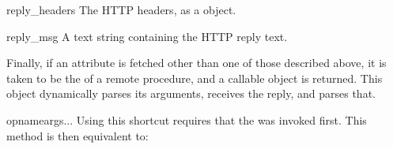\begin{memberdesc}{reply_headers}
The HTTP headers, as a  object.
\end{memberdesc}

\begin{memberdesc}{reply_msg}
A text string containing the HTTP reply text.
\end{memberdesc}

Finally, if an attribute is fetched other than one of those described
above, it is taken to be the  of a remote procedure,
and a callable object is returned.
This object dynamically parses its arguments, receives the reply, and
parses that.

\begin{methoddesc}{opname}{args...}
Using this shortcut requires that the  was invoked first.
This method is then equivalent to:
\end{methoddesc}

